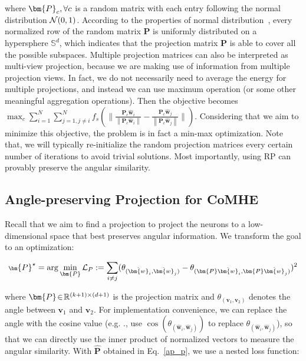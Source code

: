 where $\thickmuskip=2mu \medmuskip=2mu\bm{P}_c,\forall c$ is a random matrix with each entry following the normal distribution $\thickmuskip=2mu \medmuskip=2mu\mathcal{N}(0,1)$. According to the properties of normal distribution~\cite{cramer2016mathematical}, every normalized row of the random matrix $\bm{P}$ is uniformly distributed on a hypersphere $\mathbb{S}^d$, which indicates that the projection matrix $\bm{P}$ is able to cover all the possible subspaces. Multiple projection matrices can also be interpreted as multi-view projection, because we are making use of information from multiple projection views. In fact, we do not necessarily need to average the energy for multiple projections, and instead we can use maximum operation (or some other meaningful aggregation operations). Then the objective becomes $\max_c\sum_{i=1}^{N}\sum_{j=1, j\neq i}^{N}f_s(\|{ \frac{\bm{P}_c\hat{\bm{w}}_i}{\left\lVert\bm{P}_c\hat{\bm{w}}_i\right\rVert} -\frac{\bm{P}_c\hat{\bm{w}}_j}{\left\lVert\bm{P}_c\hat{\bm{w}}_j\right\rVert}}\|)$. Considering that we aim to minimize this objective, the problem is in fact a min-max optimization. Note that, we will typically re-initialize the random projection matrices every certain number of iterations to avoid trivial solutions. Most importantly, using RP can provably preserve the angular similarity.
\par

\subsection{Angle-preserving Projection for CoMHE}

Recall that we aim to find a projection to project the neurons to a low-dimensional space that best preserves angular information. We transform the goal to an optimization:

\begin{equation}\label{ap_p}
\scriptsize
\bm{P}^\star =\arg\min_{\bm{P}} \mathcal{L}_P:=\sum_{i\neq j} (\theta_{(\hat{\bm{w}}_i, \hat{\bm{w}}_j)} - \theta_{(\bm{P}\hat{\bm{w}}_i,\bm{P}\hat{\bm{w}}_j)})^2

\end{equation}

where $\thickmuskip=2mu \medmuskip=2mu \bm{P}\in\mathbb{R}^{(k+1)\times(d+1)}$ is the projection matrix and $\theta_{(\bm{v}_1,\bm{v}_2)}$ denotes the angle between $\bm{v}_1$ and $\bm{v}_2$. For implementation convenience, we can replace the angle with the cosine value (e.g. ., use $\cos(\theta_{(\hat{\bm{w}}_i, \hat{\bm{w}}_j)})$ to replace $\theta_{(\hat{\bm{w}}_i, \hat{\bm{w}}_j)}$), so that we can directly use the inner product of normalized vectors to measure the angular similarity. With $\hat{\bm{P}}$ obtained in Eq.~\ref{ap_p}, we use a nested loss function:

